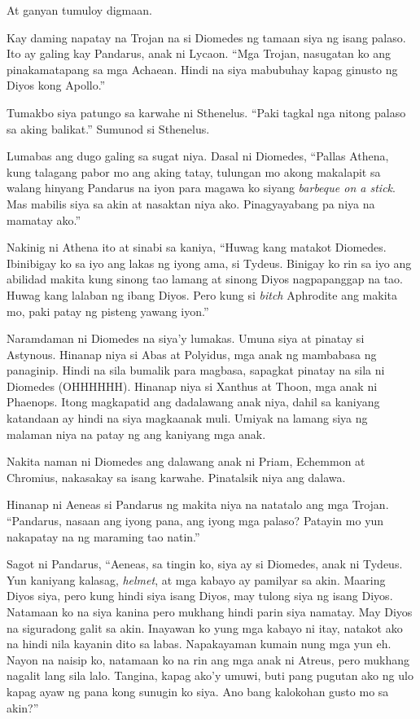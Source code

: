 \documentclass[12pt,letterpaper]{report}
\begin{document}
At ganyan tumuloy digmaan.

Kay daming napatay na Trojan na si Diomedes ng tamaan siya ng isang palaso. Ito ay galing kay Pandarus, anak ni Lycaon. ``Mga Trojan, nasugatan ko ang pinakamatapang sa mga Achaean. Hindi na siya mabubuhay kapag ginusto ng Diyos kong Apollo.''

Tumakbo siya patungo sa karwahe ni Sthenelus. ``Paki tagkal nga nitong palaso sa aking balikat.'' Sumunod si Sthenelus.

Lumabas ang dugo galing sa sugat niya. Dasal ni Diomedes, ``Pallas Athena, kung talagang pabor mo ang aking tatay, tulungan mo akong makalapit sa walang hinyang Pandarus na iyon para magawa ko siyang \textit{barbeque on a stick}. Mas mabilis siya sa akin at nasaktan niya ako. Pinagyayabang pa niya na mamatay ako.''

Nakinig ni Athena ito at sinabi sa kaniya, ``Huwag kang matakot Diomedes. Ibinibigay ko sa iyo ang lakas ng iyong ama, si Tydeus. Binigay ko rin sa iyo ang abilidad makita kung sinong tao lamang at sinong Diyos nagpapanggap na tao. Huwag kang lalaban ng ibang Diyos. Pero kung si \textit{bitch} Aphrodite ang makita mo, paki patay ng pisteng yawang iyon.''

Naramdaman ni Diomedes na siya'y lumakas. Umuna siya at pinatay si Astynous. Hinanap niya si Abas at Polyidus, mga anak ng mambabasa ng panaginip. Hindi na sila bumalik para magbasa, sapagkat pinatay na sila ni Diomedes (OHHHHHH). Hinanap niya si Xanthus at Thoon, mga anak ni Phaenops. Itong magkapatid ang dadalawang anak niya, dahil sa kaniyang katandaan ay hindi na siya magkaanak muli. Umiyak na lamang siya ng malaman niya na patay ng ang kaniyang mga anak.

Nakita naman ni Diomedes ang dalawang anak ni Priam, Echemmon at Chromius, nakasakay sa isang karwahe. Pinatalsik niya ang dalawa.

Hinanap ni Aeneas si Pandarus ng makita niya na natatalo ang mga Trojan. ``Pandarus, nasaan ang iyong pana, ang iyong mga palaso? Patayin mo yun nakapatay na ng maraming tao natin.''

Sagot ni Pandarus, ``Aeneas, sa tingin ko, siya ay si Diomedes, anak ni Tydeus. Yun kaniyang kalasag, \textit{helmet}, at mga kabayo ay pamilyar sa akin. Maaring Diyos siya, pero kung hindi siya isang Diyos, may tulong siya ng isang Diyos. Natamaan ko na siya kanina pero mukhang hindi parin siya namatay. May Diyos na siguradong galit sa akin. Inayawan ko yung mga kabayo ni itay, natakot ako na hindi nila kayanin dito sa labas. Napakayaman kumain nung mga yun eh. Nayon na naisip ko, natamaan ko na rin ang mga anak ni Atreus, pero mukhang nagalit lang sila lalo. Tangina, kapag ako'y umuwi, buti pang pugutan ako ng ulo kapag ayaw ng pana kong sunugin ko siya. Ano bang kalokohan gusto mo sa akin?''
\end{document}
